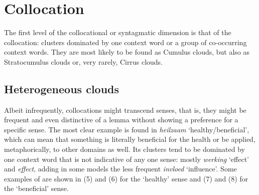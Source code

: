 \documentclass[
]{book}
\begin{document}
\hypertarget{collocation}{%
\section{Collocation}\label{collocation}}

The first level of the collocational or syntagmatic dimension is that of the collocation: clusters dominated by one context word or a group of co-occurring context words. They are most likely to be found as Cumulus clouds, but also as Stratocumulus clouds or, very rarely, Cirrus clouds.

\hypertarget{heilzaam}{%
\subsection{Heterogeneous clouds}\label{heilzaam}}

Albeit infrequently, collocations might transcend senses, that is, they might be frequent and even distinctive of a lemma without showing a preference for a specific sense.
The most clear example is found in \emph{heilzaam} `healthy/beneficial', which can mean that something is literally beneficial for the health or be applied, metaphorically, to other domains as well. Its clusters tend to be dominated by one context word that is not indicative of any one sense: mostly \emph{werking} `effect' and \emph{effect}, adding in some models the less frequent \emph{invloed} `influence'. Some examples of are shown in (5) and (6) for the `healthy' sense and (7) and (8) for the `beneficial' sense.
\end{document}
